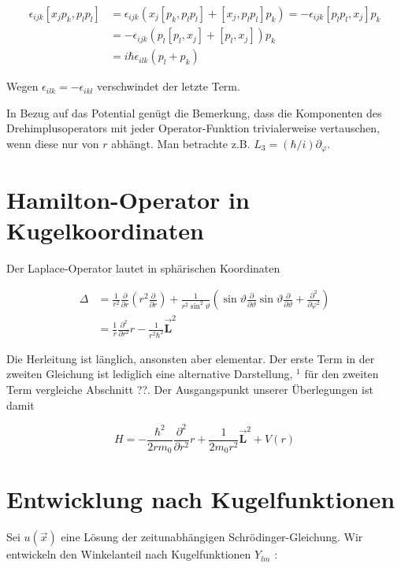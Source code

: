 \documentclass[10pt, letterpaper]{article}
\begin{document}
$$
\begin{aligned}
\epsilon_{i j k}\left[x_{j} p_{k}, p_{l} p_{l}\right] & =\epsilon_{i j k}\left(x_{j}\left[p_{k}, p_{l} p_{l}\right]+\left[x_{j}, p_{l} p_{l}\right] p_{k}\right)=-\epsilon_{i j k}\left[p_{l} p_{l}, x_{j}\right] p_{k} \\
& =-\epsilon_{i j k}\left(p_{l}\left[p_{l}, x_{j}\right]+\left[p_{l}, x_{j}\right]\right) p_{k} \\
& =i \hbar \epsilon_{i l k}\left(p_{l}+p_{k}\right)
\end{aligned}
$$

Wegen $\epsilon_{i l k}=-\epsilon_{i k l}$ verschwindet der letzte Term.

In Bezug auf das Potential genügt die Bemerkung, dass die Komponenten des Drehimplusoperators mit jeder Operator-Funktion trivialerweise vertauschen, wenn diese nur von $r$ abhängt. Man betrachte z.B. $L_{3}=(\hbar / i) \partial_{\varphi}$.

\section*{Hamilton-Operator in Kugelkoordinaten}
Der Laplace-Operator lautet in sphärischen Koordinaten

$$
\begin{aligned}
\Delta & =\frac{1}{r^{2}} \frac{\partial}{\partial r}\left(r^{2} \frac{\partial}{\partial r}\right)+\frac{1}{r^{2} \sin ^{2} \vartheta}\left(\sin \vartheta \frac{\partial}{\partial \vartheta} \sin \vartheta \frac{\partial}{\partial \vartheta}+\frac{\partial^{2}}{\partial \varphi^{2}}\right) \\
& =\frac{1}{r} \frac{\partial^{2}}{\partial r^{2}} r-\frac{1}{r^{2} \hbar^{2}} \overrightarrow{\mathbf{L}}^{2}
\end{aligned}
$$

Die Herleitung ist länglich, ansonsten aber elementar. Der erste Term in der zweiten Gleichung ist lediglich eine alternative Darstellung, ${ }^{1}$ für den zweiten Term vergleiche Abschnitt ??. Der Ausgangspunkt unserer Überlegungen ist damit

$$
H=-\frac{\hbar^{2}}{2 r m_{0}} \frac{\partial^{2}}{\partial r^{2}} r+\frac{1}{2 m_{0} r^{2}} \overrightarrow{\mathbf{L}}^{2}+V(r)
$$

\section*{Entwicklung nach Kugelfunktionen}
Sei $u(\vec{x})$ eine Lösung der zeitunabhängigen Schrödinger-Gleichung. Wir entwickeln den Winkelanteil nach Kugelfunktionen $Y_{l m}$ :
\end{document}
